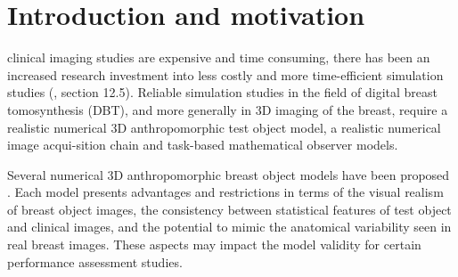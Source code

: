 \documentclass[journal]{IEEEtran}
\begin{document}
%
\IEEEpeerreviewmaketitle

\section{Introduction and motivation}
\label{sec:intr-motiv}

%
%
%
%

 clinical imaging studies are expensive and time
consuming, there has been an increased research investment into less
costly and more time-efficient simulation studies
(\cite{markey2012physics}, section 12.5). Reliable simulation studies
in the field of digital breast tomosynthesis (DBT), and more generally
in 3D imaging of the breast, require a realistic numerical 3D
anthropomorphic test object model, a realistic numerical image
acqui-sition chain and task-based mathematical observer models.

Several numerical 3D anthropomorphic breast object models have been
proposed \cite{li2009methodology} \cite{mahr2012three}
\cite{carton2014virtual} \cite{bakic2014realistic}
\cite{chen2015description} \cite{graff2016new}. Each model presents
advantages and restrictions in terms of the visual realism of breast
object images, the consistency between statistical features of test
object and clinical images, and the potential to mimic the anatomical
variability seen in real breast images. These aspects may impact the
model validity for certain performance assessment studies.
\end{document}
